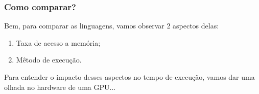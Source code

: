 \documentclass[brazil]{beamer}
\begin{document}
\begin{frame}[fragile]
  \frametitle{Como comparar?}
  Bem, para comparar as linguagens, vamos observar 2 aspectos delas:
  \begin{enumerate}
    \item Taxa de acesso a memória;
    \item Mêtodo de execução.
  \end{enumerate}
  Para entender o impacto desses aspectos no tempo de execução, vamos dar uma olhada no hardware de uma GPU...
\end{frame}

\end{document}
